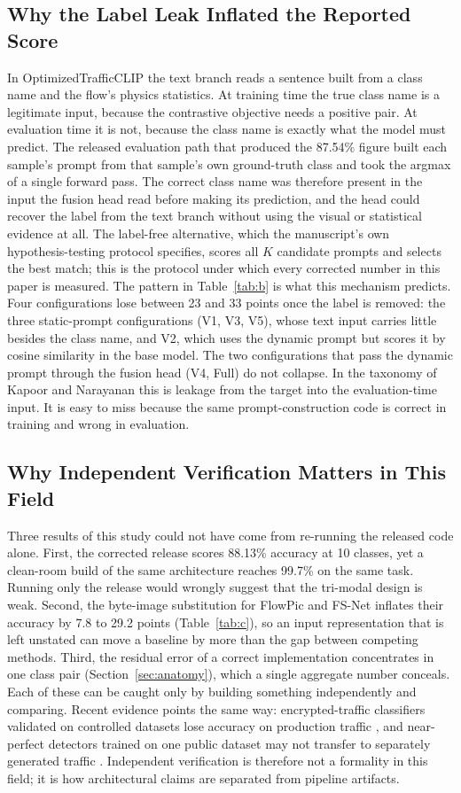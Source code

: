 \documentclass[journal]{IEEEtran}
\begin{document}
\subsection{Why the Label Leak Inflated the Reported Score}
In OptimizedTrafficCLIP the text branch reads a sentence built from a class name and the flow's physics statistics. At training time the true class name is a legitimate input, because the contrastive objective needs a positive pair. At evaluation time it is not, because the class name is exactly what the model must predict. The released evaluation path that produced the 87.54\% figure built each sample's prompt from that sample's own ground-truth class and took the argmax of a single forward pass. The correct class name was therefore present in the input the fusion head read before making its prediction, and the head could recover the label from the text branch without using the visual or statistical evidence at all. The label-free alternative, which the manuscript's own hypothesis-testing protocol specifies, scores all $K$ candidate prompts and selects the best match; this is the protocol under which every corrected number in this paper is measured. The pattern in Table~\ref{tab:b} is what this mechanism predicts. Four configurations lose between 23 and 33 points once the label is removed: the three static-prompt configurations (V1, V3, V5), whose text input carries little besides the class name, and V2, which uses the dynamic prompt but scores it by cosine similarity in the base model. The two configurations that pass the dynamic prompt through the fusion head (V4, Full) do not collapse. In the taxonomy of Kapoor and Narayanan \cite{kapoor2023} this is leakage from the target into the evaluation-time input. It is easy to miss because the same prompt-construction code is correct in training and wrong in evaluation.

\subsection{Why Independent Verification Matters in This Field}
Three results of this study could not have come from re-running the released code alone. First, the corrected release scores 88.13\% accuracy at 10 classes, yet a clean-room build of the same architecture reaches 99.7\% on the same task. Running only the release would wrongly suggest that the tri-modal design is weak. Second, the byte-image substitution for FlowPic and FS-Net inflates their accuracy by 7.8 to 29.2 points (Table~\ref{tab:c}), so an input representation that is left unstated can move a baseline by more than the gap between competing methods. Third, the residual error of a correct implementation concentrates in one class pair (Section~\ref{sec:anatomy}), which a single aggregate number conceals. Each of these can be caught only by building something independently and comparing. Recent evidence points the same way: encrypted-traffic classifiers validated on controlled datasets lose accuracy on production traffic \cite{malekghaini2023}, and near-perfect detectors trained on one public dataset may not transfer to separately generated traffic \cite{catillo2022}. Independent verification is therefore not a formality in this field; it is how architectural claims are separated from pipeline artifacts.
\end{document}

